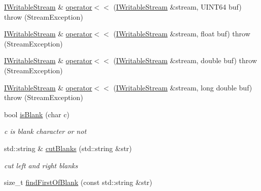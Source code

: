 \begin{DoxyCompactItemize}
\item 
\hyperlink{classsinsy_1_1IWritableStream}{\-I\-Writable\-Stream} \& \hyperlink{namespacesinsy_aba36d9ca224469c11a7af1dc67a789fa}{operator$<$$<$} (\hyperlink{classsinsy_1_1IWritableStream}{\-I\-Writable\-Stream} \&stream, \-U\-I\-N\-T64 buf)  throw (\-Stream\-Exception)
\item 
\hyperlink{classsinsy_1_1IWritableStream}{\-I\-Writable\-Stream} \& \hyperlink{namespacesinsy_a096b1cfd82f040deb8c25e82f0435fdb}{operator$<$$<$} (\hyperlink{classsinsy_1_1IWritableStream}{\-I\-Writable\-Stream} \&stream, float buf)  throw (\-Stream\-Exception)
\item 
\hyperlink{classsinsy_1_1IWritableStream}{\-I\-Writable\-Stream} \& \hyperlink{namespacesinsy_a92683e6ad27a9d168952a2fa5f2505c6}{operator$<$$<$} (\hyperlink{classsinsy_1_1IWritableStream}{\-I\-Writable\-Stream} \&stream, double buf)  throw (\-Stream\-Exception)
\item 
\hyperlink{classsinsy_1_1IWritableStream}{\-I\-Writable\-Stream} \& \hyperlink{namespacesinsy_a27a663d1bb8089482c82d39035394a71}{operator$<$$<$} (\hyperlink{classsinsy_1_1IWritableStream}{\-I\-Writable\-Stream} \&stream, long double buf)  throw (\-Stream\-Exception)
\item 
\hypertarget{namespacesinsy_abfa758c890bd823dd077aeb1d507c29f}{bool \hyperlink{namespacesinsy_abfa758c890bd823dd077aeb1d507c29f}{is\-Blank} (char c)}\label{namespacesinsy_abfa758c890bd823dd077aeb1d507c29f}

\begin{DoxyCompactList}\small\item\em c is blank character or not \end{DoxyCompactList}\item 
\hypertarget{namespacesinsy_a8763b219e6b691c21faeed13173fa9cb}{std\-::string \& \hyperlink{namespacesinsy_a8763b219e6b691c21faeed13173fa9cb}{cut\-Blanks} (std\-::string \&str)}\label{namespacesinsy_a8763b219e6b691c21faeed13173fa9cb}

\begin{DoxyCompactList}\small\item\em cut left and right blanks \end{DoxyCompactList}\item 
\hypertarget{namespacesinsy_a57f54ea0190e3d23874ef1e75bf17a6b}{size\-\_\-t \hyperlink{namespacesinsy_a57f54ea0190e3d23874ef1e75bf17a6b}{find\-First\-Of\-Blank} (const std\-::string \&str)}\label{namespacesinsy_a57f54ea0190e3d23874ef1e75bf17a6b}


\end{DoxyCompactItemize}
